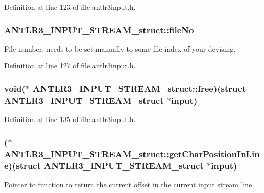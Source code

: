 Definition at line 123 of file antlr3input.\-h.

\hypertarget{struct_a_n_t_l_r3___i_n_p_u_t___s_t_r_e_a_m__struct_af3a29ce19ec2349bf234303390890b28}{
\subsubsection[{file\-No}]{ A\-N\-T\-L\-R3\-\_\-\-I\-N\-P\-U\-T\-\_\-\-S\-T\-R\-E\-A\-M\-\_\-struct\-::file\-No}}\label{struct_a_n_t_l_r3___i_n_p_u_t___s_t_r_e_a_m__struct_af3a29ce19ec2349bf234303390890b28}
File number, needs to be set manually to some file index of your devising. 

Definition at line 127 of file antlr3input.\-h.

\hypertarget{struct_a_n_t_l_r3___i_n_p_u_t___s_t_r_e_a_m__struct_a942654996b465ef576470e0beb0519ab}{
\subsubsection[{free}]{\setlength{\rightskip}{0pt plus 5cm}void($\ast$ A\-N\-T\-L\-R3\-\_\-\-I\-N\-P\-U\-T\-\_\-\-S\-T\-R\-E\-A\-M\-\_\-struct\-::free)(struct {\bf A\-N\-T\-L\-R3\-\_\-\-I\-N\-P\-U\-T\-\_\-\-S\-T\-R\-E\-A\-M\-\_\-struct} $\ast$input)}}\label{struct_a_n_t_l_r3___i_n_p_u_t___s_t_r_e_a_m__struct_a942654996b465ef576470e0beb0519ab}


Definition at line 135 of file antlr3input.\-h.

\hypertarget{struct_a_n_t_l_r3___i_n_p_u_t___s_t_r_e_a_m__struct_a1a12fe9fd03a2057c1956c5063c8d7b3}{
\subsubsection[{get\-Char\-Position\-In\-Line}]{($\ast$ A\-N\-T\-L\-R3\-\_\-\-I\-N\-P\-U\-T\-\_\-\-S\-T\-R\-E\-A\-M\-\_\-struct\-::get\-Char\-Position\-In\-Line)(struct {\bf A\-N\-T\-L\-R3\-\_\-\-I\-N\-P\-U\-T\-\_\-\-S\-T\-R\-E\-A\-M\-\_\-struct} $\ast$input)}}\label{struct_a_n_t_l_r3___i_n_p_u_t___s_t_r_e_a_m__struct_a1a12fe9fd03a2057c1956c5063c8d7b3}
Pointer to function to return the current offset in the current input stream line 

